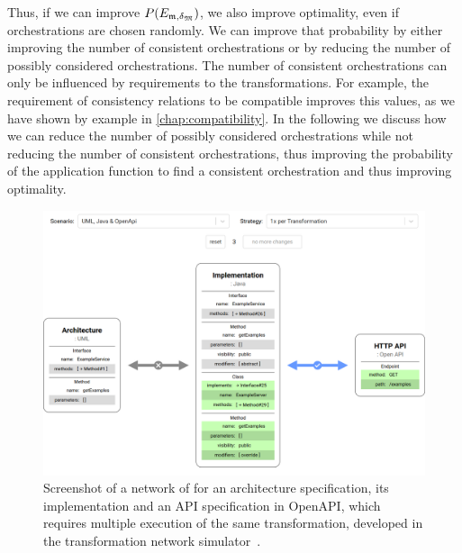 Thus, if we can improve $P(E_{\modeltuple{m},\changetuple{\metamodeltuple{M}}})$, we also improve optimality, even if orchestrations are chosen randomly.
We can improve that probability by either improving the number of consistent orchestrations or by reducing the number of possibly considered orchestrations.
The number of consistent orchestrations can only be influenced by requirements to the transformations.
For example, the requirement of consistency relations to be compatible improves this values, as we have shown by example in \autoref{chap:compatibility}.
In the following we discuss how we can reduce the number of possibly considered orchestrations while not reducing the number of consistent orchestrations, thus improving the probability of the application function to find a consistent orchestration and thus improving optimality.

\begin{figure}
    \centering
    \includegraphics[width=\textwidth]{figures/correctness/orchestration/simulator_screenshot.png}
    \caption[Screenshot of the transformation network simulator]{Screenshot of a network of for an architecture specification, its implementation and an API specification in OpenAPI, which requires multiple execution of the same transformation, developed in the transformation network simulator~\cite{orchestrationSimulator}.}
    \label{fig:orchestration:simulator}
\end{figure}


